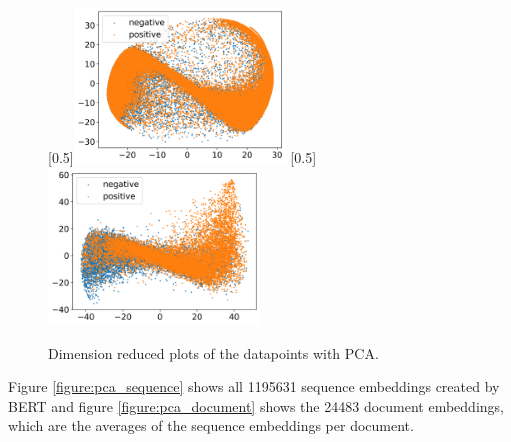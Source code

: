 \begin{figure}[h]
    [0.5\linewidth]{\includegraphics[width=0.5\textwidth]{figures/pca_scatter_sequence_level.png}}
    [0.5\linewidth]{\includegraphics[width=0.5\textwidth]{figures/pca_scatter_document_level.png}}
    \caption{Dimension reduced plots of the datapoints with \ac{PCA}.}
    \label{figure:pca}
\end{figure}
Figure \ref{figure:pca_sequence} shows all 1195631 sequence embeddings created by \ac{BERT} and figure \ref{figure:pca_document} shows the 24483 document embeddings, which are the averages of the sequence embeddings per document.

